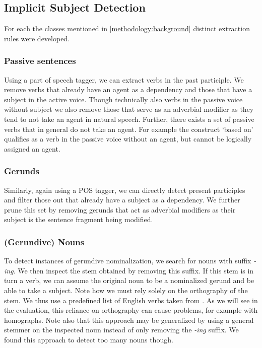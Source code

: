 \documentclass[times, 10pt,twocolumn]{article}
\begin{document}
\subsection{Implicit Subject Detection}
For each the classes mentioned in \ref{methodology:background} distinct extraction rules were developed.

\subsubsection{Passive sentences}
Using a part of speech tagger, we can extract verbs in the past participle. We remove verbs that
already have an agent as a dependency and those that have a subject in the active voice.
Though technically also verbs in the passive voice without subject we also remove those that
serve as an adverbial modifier as they tend to not take an agent in natural speech.
Further, there exists a set of passive verbs that in general do not take an agent.
For example the construct `based on' qualifies as a verb in the passive voice without an agent,
but cannot be logically assigned an agent.  

\subsubsection{Gerunds}
Similarly, again using a POS tagger, we can directly detect present participles and filter those
out that already have a subject as a dependency. We further prune this set by removing gerunds that
act as adverbial modifiers as their subject is the sentence fragment being modified. 


\subsubsection{(Gerundive) Nouns}
To detect instances of gerundive nominalization, we search for nouns with suffix \textit{-ing}.
We then inspect the stem obtained by removing this suffix. If this stem is in turn a verb, we can
assume the original noun to be a nominalized gerund and be able to take a subject.
Note how we must rely solely on the orthography of the stem. We thus use a predefined list of
English verbs taken from \cite{pattern_library}.
As we will see in the evaluation, this reliance on orthography can cause problems, for example
with homographs.
Note also that this approach may be generalized by using a general stemmer on the inspected noun instead
of only removing the \textit{-ing} suffix. We found this approach to detect too many nouns though.
\end{document}

